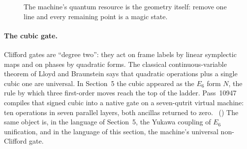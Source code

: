\begin{figure}[htbp]
\centering
{}
\caption{The machine's quantum resource is the geometry itself: remove one line and every
remaining point is a magic state.}
\label{fig:magic}
\end{figure}

\paragraph{The cubic gate.}
Clifford gates are ``degree two'': they act on frame labels by linear symplectic maps and
on phases by quadratic forms. The classical continuous-variable theorem of Lloyd and
Braunstein \cite{LloydBraunstein} says that quadratic operations plus a single cubic one are universal. In
Section~5 the cubic appeared as the $E_6$ form $N$, the rule by which three first-order moves
reach the top of the ladder. Pass~10947 compiles that signed cubic into a native gate on a
seven-qutrit virtual machine: ten operations in seven parallel layers, both ancillas returned
to zero. \tierC\ () The same object is,
in the language of Section~5, the Yukawa coupling of $E_6$ unification, and in the language of
this section, the machine's universal non-Clifford gate. \tierB


